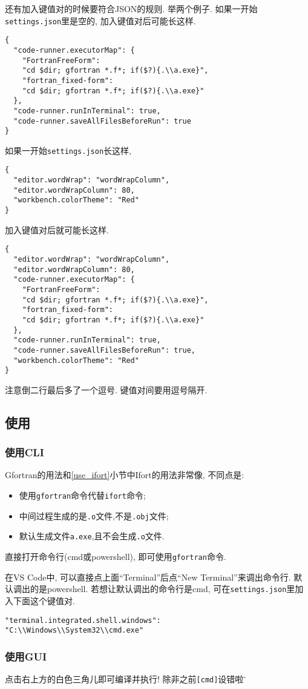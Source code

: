 还有加入键值对的时候要符合JSON的规则. 举两个例子.
如果一开始\verb|settings.json|里是空的, 加入键值对后可能长这样.
\begin{verbatim}
{
  "code-runner.executorMap": {
    "FortranFreeForm":
    "cd $dir; gfortran *.f*; if($?){.\\a.exe}",
    "fortran_fixed-form":
    "cd $dir; gfortran *.f*; if($?){.\\a.exe}"
  },
  "code-runner.runInTerminal": true,
  "code-runner.saveAllFilesBeforeRun": true
}
\end{verbatim}
如果一开始\verb|settings.json|长这样,
\begin{verbatim}
{
  "editor.wordWrap": "wordWrapColumn",
  "editor.wordWrapColumn": 80,
  "workbench.colorTheme": "Red"
}
\end{verbatim}
加入键值对后就可能长这样.
\begin{verbatim}
{
  "editor.wordWrap": "wordWrapColumn",
  "editor.wordWrapColumn": 80,
  "code-runner.executorMap": {
    "FortranFreeForm":
    "cd $dir; gfortran *.f*; if($?){.\\a.exe}",
    "fortran_fixed-form":
    "cd $dir; gfortran *.f*; if($?){.\\a.exe}"
  },
  "code-runner.runInTerminal": true,
  "code-runner.saveAllFilesBeforeRun": true,
  "workbench.colorTheme": "Red"
}
\end{verbatim}
注意倒二行最后多了一个逗号. 键值对间要用逗号隔开.

\subsection{使用}\label{use_gfortran}

\subsubsection{使用CLI}
Gfortran的用法和\ref{use_ifort}小节中Ifort的用法非常像, 不同点是:
\begin{itemize}
  \item 使用\verb|gfortran|命令代替\verb|ifort|命令;
  \item 中间过程生成的是\verb|.o|文件,不是\verb|.obj|文件;
  \item 默认生成文件\verb|a.exe|,且不会生成\verb|.o|文件.
\end{itemize}

直接打开命令行(cmd或powershell), 即可使用\verb|gfortran|命令.

在VS Code中, 可以直接点上面``Terminal''后点``New Terminal''来调出命令行. 默认调出的是powershell. 若想让默认调出的命令行是cmd, 可在\verb|settings.json|里加入下面这个键值对.
\begin{verbatim}
"terminal.integrated.shell.windows":
"C:\\Windows\\System32\\cmd.exe"
\end{verbatim}

\subsubsection{使用GUI}
点击右上方的白色三角儿即可编译并执行! 除非之前\verb|[cmd]|设错啦$\!\text{\~{}}$
